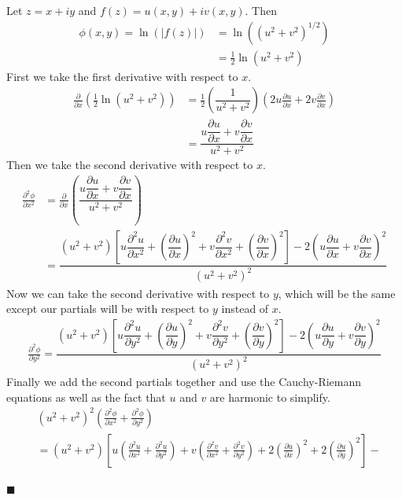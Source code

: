 \documentclass[12pt]{article}
\renewcommand{\qed}{\hfill$\blacksquare$}
\renewenvironment{proof}{\vspace{1em}\begin{addmargin}[2em]{0em}\begin{newproof}}{\end{newproof}\end{addmargin}\qed}
\begin{document}
\begin{proof} Let $z = x + iy$ and $f(z) = u(x,y) + iv(x,y)$. Then
	\begin{align*}
		\phi(x,y) = \ln(|f(z)|) &= \ln((u^2 + v^2)^{1/2}) \\
			    &= \frac{1}{2}\ln(u^2 + v^2)
	\end{align*}
	First we take the first derivative with respect to $x$.
	\begin{align*}
		\frac{\partial}{\partial x} \left(\frac{1}{2}\ln(u^2 + v^2)\right) &= \frac{1}{2}\left(\dfrac{1}{u^2 + v^2}\right)\left(2u\frac{\partial u}{\partial x} + 2v\frac{\partial v}{\partial x}\right) \\
										   &= \dfrac{u\dfrac{\partial u}{\partial x} + v\dfrac{\partial v}{\partial x}}{u^2 + v^2}
	\end{align*}
	Then we take the second derivative with respect to $x$.
	\begin{align*}
		\frac{\partial^2 \phi}{\partial x^2} &= 
		\frac{\partial}{\partial x}\left(\dfrac{u\dfrac{\partial u}{\partial x} + v\dfrac{\partial v}{\partial x}}{u^2 + v^2} \right) \\
										       &= \dfrac{(u^2 + v^2)\left[u\dfrac{\partial^2 u}{\partial x^2} + \left(\dfrac{\partial u}{\partial x}\right)^2 + v\dfrac{\partial^2 v}{\partial x^2} + \left(\dfrac{\partial v}{\partial x} \right)^2\right] - 2\left(u\dfrac{\partial u}{\partial x} + v\dfrac{\partial v}{\partial x}\right)^2}{\left(u^2 + v^2\right)^2}
	\end{align*}
	Now we can take the second derivative with respect to $y$, which will be the same except our partials will be with respect to $y$ instead of $x$.
	\begin{align*}
		\frac{\partial^2 \phi}{\partial y^2} = \dfrac{(u^2 + v^2)\left[u\dfrac{\partial^2 u}{\partial y^2} + \left(\dfrac{\partial u}{\partial y}\right)^2 + v\dfrac{\partial^2 v}{\partial y^2} + \left(\dfrac{\partial v}{\partial y} \right)^2\right] - 2\left(u\dfrac{\partial u}{\partial y} + v\dfrac{\partial v}{\partial y}\right)^2}{\left(u^2 + v^2\right)^2}
	\end{align*}
	Finally we add the second partials together and use the Cauchy-Riemann equations as well as the fact that $u$ and $v$ are harmonic to simplify.
	\begin{align*}
		&\left(u^2 + v^2\right)^2\left(\frac{\partial^2 \phi}{\partial x^2} + \frac{\partial^2 \phi}{\partial y^2}\right) \\ &= (u^2 + v^2)\left[u\left(\frac{\partial^2 u}{\partial x^2} + \frac{\partial^2 u}{\partial y^2}\right) + v\left(\frac{\partial^2 v}{\partial x^2} + \frac{\partial^2 v}{\partial y^2}\right) + 2\left(\frac{\partial u}{\partial x}\right)^2 + 2\left(\frac{\partial u}{\partial y}\right)^2\right] - \\

\end{align*}
\end{proof}
\end{document}
